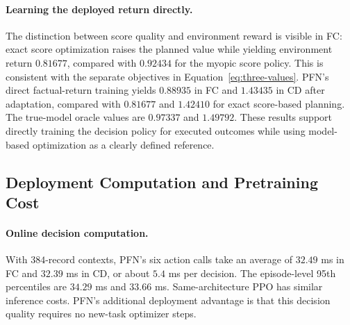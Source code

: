 \documentclass[a4paper,11pt]{article}
\numberwithin{equation}{section}
\begin{document}
\paragraph{Learning the deployed return directly.}
The distinction between score quality and environment reward is visible in FC: exact score optimization raises the planned value while yielding environment return $0.81677$, compared with $0.92434$ for the myopic score policy. This is consistent with the separate objectives in Equation~\eqref{eq:three-values}. PFN's direct factual-return training yields $0.88935$ in FC and $1.43435$ in CD after adaptation, compared with $0.81677$ and $1.42410$ for exact score-based planning. The true-model oracle values are $0.97337$ and $1.49792$. These results support directly training the decision policy for executed outcomes while using model-based optimization as a clearly defined reference.

\FloatBarrier
\subsection{Deployment Computation and Pretraining Cost}
\label{sec:deployment-results}
\paragraph{Online decision computation.}
With $384$-record contexts, PFN's six action calls take an average of $32.49$ ms in FC and $32.39$ ms in CD, or about $5.4$ ms per decision. The episode-level 95th percentiles are $34.29$ ms and $33.66$ ms. Same-architecture PPO has similar inference costs. PFN's additional deployment advantage is that this decision quality requires no new-task optimizer steps.
\end{document}
